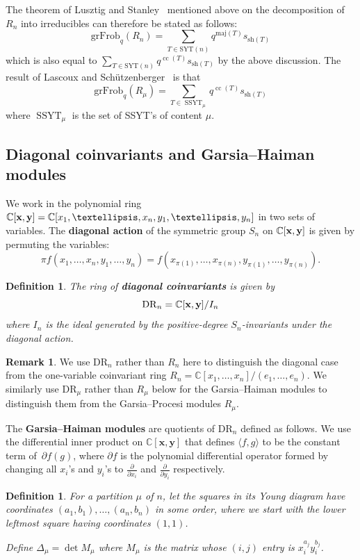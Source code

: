 \documentclass[11pt]{article}
\newtheorem{definition}[theo]{Definition}
\theoremstyle{definition}
\newtheorem{remark}[theo]{Remark}
\numberwithin{equation}{section}
\DeclareMathOperator{\cc}{cc}
\DeclareMathOperator{\SSYT}{SSYT}
\newcommand{\SYT}{\mathrm{SYT}}
\newcommand{\sh}{\mathrm{sh}}
\newcommand{\maj}{\mathrm{maj}}
\newcommand{\DR}{\mathrm{DR}}
\newcommand{\CC}{\mathbb{C}}
\newcommand{\grFrob}{\mathrm{grFrob}}
\begin{document}
The theorem of Lusztig and Stanley~\cite{Stanley} mentioned above on the decomposition of~$R_n$ into irreducibles can therefore be stated as follows:
$$\grFrob_q(R_n)=\sum_{T\in \SYT(n)} q^{\maj(T)}s_{\sh(T)}$$
which is also equal to $\sum_{T\in \SYT(n)} q^{\cc(T)}s_{\sh(T)}$ by the above discussion. The result of Lascoux and Sch\"utzenberger~\cite{LascouxSchutzenberger} is that $$\grFrob_q(R_\mu)=\sum_{T\in \SSYT_\mu} q^{\cc(T)}s_{\sh(T)}$$ where $\SSYT_\mu$ is the set of SSYT's of content $\mu$.  

\subsection{Diagonal coinvariants and Garsia--Haiman modules}\label{sec:GH}

We work in the polynomial ring $\CC[{\bf x}, {\bf y}]=\CC[x_1,\ldots,x_n,y_1,\ldots,y_n]$ in two sets of variables.  The \textbf{diagonal action} of the symmetric group $S_n$ on $\CC[\bf x,\bf y]$ is given by permuting the variables: $$\pi f(x_1,\ldots,x_n,y_1,\ldots,y_n)=f(x_{\pi(1)},\ldots,x_{\pi(n)},y_{\pi(1)},\ldots, y_{\pi(n)}).$$

\begin{definition}
	The ring of \textbf{diagonal coinvariants} is given by $$\DR_n=\CC[{\bf x}, {\bf y}]/I_n$$ where $I_n$ is the ideal generated by the positive-degree $S_n$-invariants under the diagonal action.
\end{definition}

\begin{remark}
	We use $\DR_n$ rather than $R_n$ here to distinguish the diagonal case from the one-variable coinvariant ring $R_n=\CC[x_1,\ldots,x_n]/(e_1,\ldots,e_n)$.  We similarly use $\DR_\mu$ rather than $R_\mu$ below for the Garsia--Haiman modules to distinguish them from the Garsia--Procesi modules $R_\mu$.  
\end{remark}

The \textbf{Garsia--Haiman modules} are quotients of $\DR_n$ defined as follows.  We use the differential inner product on $\CC[\mathbf{x},\mathbf{y}]$ that defines $\langle f, g \rangle$ to be the constant term of~$\partial f(g)$, where $\partial f$ is the polynomial differential operator formed by changing all $x_i$'s and $y_i$'s to $\frac{\partial}{\partial x_i}$ and $\frac{\partial}{\partial y_i}$ respectively.



\begin{definition}
	For a partition $\mu$ of $n$, let the squares in its Young diagram have coordinates $(a_1,b_1),\ldots,(a_n,b_n)$ in some order, where we start with the lower leftmost square having coordinates $(1,1)$. 
	
	Define $\Delta_\mu=\det M_\mu$ where $M_\mu$ is the matrix whose $(i,j)$ entry is $x_i^{a_j}y_i^{b_j}$.
\end{definition}
\end{document}

